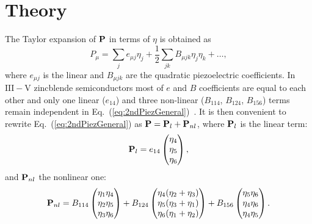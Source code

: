 
\newpage 





\section{Theory}

The Taylor expansion of ${\bf P}$ in terms of $\eta$ is obtained as
%
\begin{equation}
\label{eq:2ndPiezGeneral}
P_{\mu}=\sum_je_{\mu j}\eta_j+\frac{1}{2}\sum_{jk}B_{\mu jk}\eta_j\eta_k+\dots,
\end{equation}
%
where $e_{\mu j}$ is the linear and $B_{\mu jk}$ are the quadratic piezoelectric coefficients. In $\mathrm{III-V}$ zincblende semiconductors most of $e$ and $B$ coefficients are equal to each other and only one linear ($e_{14}$) and three non-linear ($B_{114}$, $B_{124}$, $B_{156}$) terms remain independent in Eq.~(\ref{eq:2ndPiezGeneral})~\cite{Beya-Wakata2011}. It is then convenient to rewrite Eq.~(\ref{eq:2ndPiezGeneral}) as ${\bf P}={\bf P}_{l}+{\bf P}_{nl}$, where ${\bf P}_{l}$ is the linear term:
%
%
\begin{equation}
\label{eq:1stPiez}
{\bf P}_{l}=e_{14}\begin{pmatrix}\eta_4\\\eta_5\\\eta_6\end{pmatrix},
\end{equation}
%
and ${\bf P}_{nl}$ the nonlinear one:
%
\begin{equation}
\label{eq:2ndPiez}
{\bf P}_{nl}=B_{114}\begin{pmatrix}\eta_1\eta_4\\\eta_2\eta_5\\\eta_3\eta_6\end{pmatrix}+
B_{124}\begin{pmatrix}\eta_4(\eta_2+\eta_3)\\\eta_5(\eta_3+\eta_1)\\\eta_6(\eta_1+\eta_2)\end{pmatrix}+
B_{156}\begin{pmatrix}\eta_5\eta_6\\\eta_4\eta_6\\\eta_4\eta_5\end{pmatrix}.
\end{equation}
